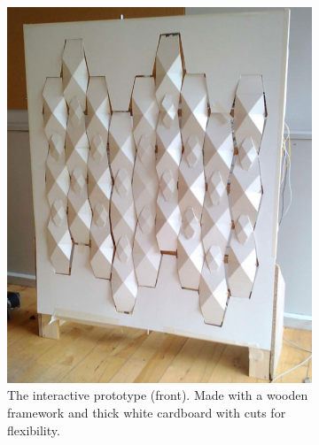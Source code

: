 \begin{figure}[ht]
	\centering
	\begin{subfigure}{.45\textwidth}
		\centering
		\includegraphics[width=\linewidth]{figures/beomotion/prototype_front}
		\caption{The interactive prototype (front). Made with a wooden framework and thick white cardboard with cuts for flexibility.}
		\label{fig:beomotion:proto_front}
	\end{subfigure}%
	\hspace{0.1cm}
	\vspace{0.5cm}
	\begin{subfigure}{.45\textwidth}
		\centering

\end{subfigure}
\end{figure}
